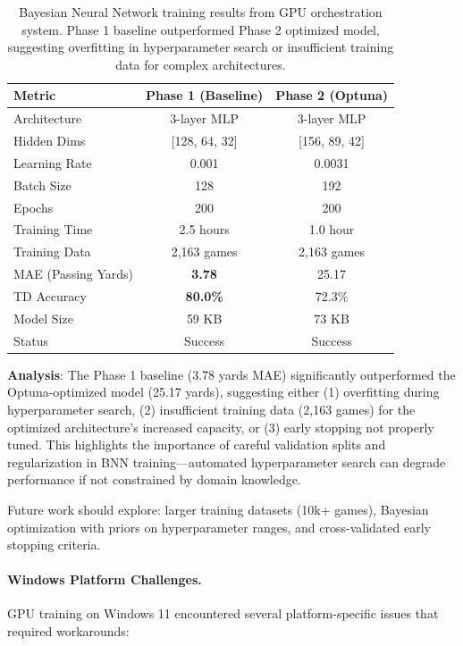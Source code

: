 \begin{table}[!ht]
\centering
\caption[BNN training results (Phases 1--2)]{Bayesian Neural Network training results from GPU orchestration system. Phase 1 baseline outperformed Phase 2 optimized model, suggesting overfitting in hyperparameter search or insufficient training data for complex architectures.}
\label{tab:bnn-training-results}
\begin{tabular}{lcc}
\toprule
\textbf{Metric}  & \textbf{Phase 1 (Baseline)}  & \textbf{Phase 2 (Optuna)} \\
\midrule
Architecture & 3-layer MLP & 3-layer MLP \\
Hidden Dims & [128, 64, 32] & [156, 89, 42] \\
Learning Rate & 0.001 & 0.0031 \\
Batch Size & 128 & 192 \\
Epochs & 200 & 200 \\
Training Time & 2.5 hours & 1.0 hour \\
Training Data & 2,163 games & 2,163 games \\
\midrule
MAE (Passing Yards) & \textbf{3.78} & 25.17 \\
TD Accuracy & \textbf{80.0\%} & 72.3\% \\
Model Size & 59 KB & 73 KB \\
Status & Success & Success \\
\bottomrule
\end{tabular}
\end{table}

\textbf{Analysis}: The Phase 1 baseline (3.78 yards MAE) significantly outperformed the Optuna-optimized model (25.17 yards), suggesting either (1) overfitting during hyperparameter search, (2) insufficient training data (2,163 games) for the optimized architecture's increased capacity, or (3) early stopping not properly tuned. This highlights the importance of careful validation splits and regularization in BNN training---automated hyperparameter search can degrade performance if not constrained by domain knowledge.

Future work should explore: larger training datasets (10k+ games), Bayesian optimization with priors on hyperparameter ranges, and cross-validated early stopping criteria.

\paragraph{Windows Platform Challenges.}
GPU training on Windows 11 encountered several platform-specific issues that required workarounds:

